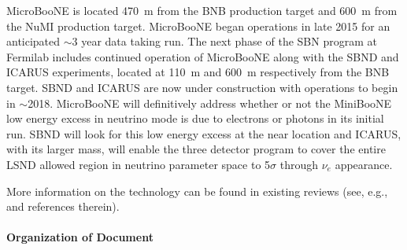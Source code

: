
MicroBooNE is located 470~m from the BNB production target and 600~m from the NuMI production target.  MicroBooNE began operations in late 2015 for an anticipated $\sim$3 year data taking run.   The next phase of the SBN program at Fermilab includes continued operation of MicroBooNE along with the SBND and ICARUS experiments, located at 110~m and 600~m respectively from the BNB target.  SBND and ICARUS are now under construction  \cite{Adams:2013-lar1nd} with operations to begin in $\sim$2018.  MicroBooNE will definitively address whether or not the MiniBooNE low energy excess in neutrino mode is due to electrons or photons in its initial run.  SBND will look for this low energy excess at the near location and ICARUS, with its larger mass, will enable the three detector program to cover the entire LSND allowed region in neutrino parameter space to 5$\sigma$ through $\nu_e$ appearance.





More information on the \lartpc technology can be found in existing reviews (see, e.g.,~\cite{Marchionni:2013} and references therein).
 
 \paragraph{Organization of Document}

